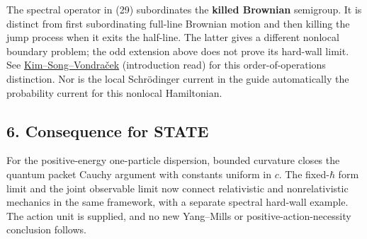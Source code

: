\documentclass[11pt,a4paper]{article}
\begin{document}
The spectral operator in (29) subordinates the \textbf{killed Brownian}
semigroup. It is distinct from first subordinating full-line Brownian
motion and then killing the jump process when it exits the half-line.
The latter gives a different nonlocal boundary problem; the odd
extension above does not prove its hard-wall limit. See
\href{https://arxiv.org/abs/1610.00872}{Kim--Song--Vondraček}
(introduction read) for this order-of-operations distinction. Nor is the
local Schrödinger current in the guide automatically the probability
current for this nonlocal Hamiltonian.

\hypertarget{consequence-for-state}{%
\subsection{6. Consequence for STATE}\label{consequence-for-state}}

For the positive-energy one-particle dispersion, bounded curvature
closes the quantum packet Cauchy argument with constants uniform in
\(c\). The fixed-\(\hbar\) form limit and the joint observable limit now
connect relativistic and nonrelativistic mechanics in the same
framework, with a separate spectral hard-wall example. The action unit
is supplied, and no new Yang--Mills or positive-action-necessity
conclusion follows.
\end{document}
